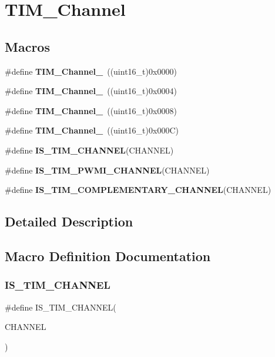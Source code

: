 \section{T\+I\+M\+\_\+\+Channel}
\label{group__TIM__Channel}
\subsection*{Macros}
\begin{DoxyCompactItemize}
\item 
\#define \textbf{ T\+I\+M\+\_\+\+Channel\+\_}~((uint16\+\_\+t)0x0000)
\item 
\#define \textbf{ T\+I\+M\+\_\+\+Channel\+\_}~((uint16\+\_\+t)0x0004)
\item 
\#define \textbf{ T\+I\+M\+\_\+\+Channel\+\_}~((uint16\+\_\+t)0x0008)
\item 
\#define \textbf{ T\+I\+M\+\_\+\+Channel\+\_}~((uint16\+\_\+t)0x000\+C)
\item 
\#define \textbf{ I\+S\+\_\+\+T\+I\+M\+\_\+\+C\+H\+A\+N\+N\+EL}(C\+H\+A\+N\+N\+EL)
\item 
\#define \textbf{ I\+S\+\_\+\+T\+I\+M\+\_\+\+P\+W\+M\+I\+\_\+\+C\+H\+A\+N\+N\+EL}(C\+H\+A\+N\+N\+EL)
\item 
\#define \textbf{ I\+S\+\_\+\+T\+I\+M\+\_\+\+C\+O\+M\+P\+L\+E\+M\+E\+N\+T\+A\+R\+Y\+\_\+\+C\+H\+A\+N\+N\+EL}(C\+H\+A\+N\+N\+EL)
\end{DoxyCompactItemize}


\subsection{Detailed Description}


\subsection{Macro Definition Documentation}
\mbox{\label{group__TIM__Channel_gae9721e3731e5fd983c83a9c1d32ef03d}} 
\subsubsection{I\+S\+\_\+\+T\+I\+M\+\_\+\+C\+H\+A\+N\+N\+EL}
{\footnotesize\ttfamily \#define I\+S\+\_\+\+T\+I\+M\+\_\+\+C\+H\+A\+N\+N\+EL(\begin{DoxyParamCaption}\item[{}]{C\+H\+A\+N\+N\+EL }\end{DoxyParamCaption})}

